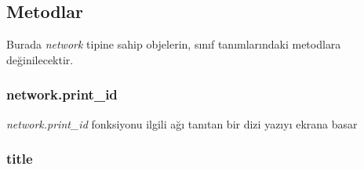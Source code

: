 \subsection{Metodlar}

Burada \emph{network} tipine sahip objelerin, sınıf tanımlarındaki metodlara değinilecektir.
\subsubsection{network.print\_id}

\emph{network.print\_id} fonksiyonu ilgili ağı tanıtan bir dizi yazıyı ekrana basar

\subsubsection{title}




